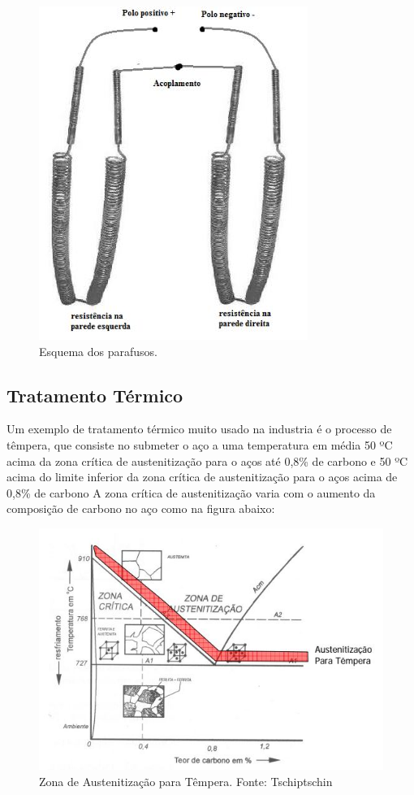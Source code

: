 \begin{figure}[!h]
	\centering
	\label{parafusos}
	\includegraphics[keepaspectratio=true,scale=0.8]{figuras/parafusos.JPG}
	\caption{Esquema dos parafusos.}
\end{figure}

\subsection{Tratamento Térmico}

Um exemplo de tratamento térmico muito usado na industria é o processo de têmpera, que consiste no submeter o aço a uma temperatura em média 50 ºC acima da zona crítica de austenitização para o aços até 0,8\% de carbono e 50 ºC acima do limite inferior da zona crítica de austenitização para o aços acima de 0,8\% de carbono A zona crítica de austenitização varia com o aumento da composição de carbono no aço como na figura abaixo:
\begin{figure}[!h]
	\centering
	\label{austenitizacao}
	\includegraphics[keepaspectratio=true,scale=0.8]{figuras/austenitizacao.JPG}
	\caption{Zona de Austenitização para Têmpera. Fonte: Tschiptschin}
\end{figure}

